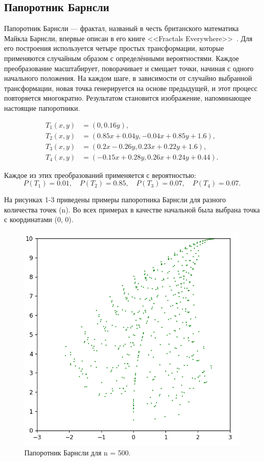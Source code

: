 \documentclass[11pt,a4paper,final]{article} %
\begin{document}
\subsection{Папоротник Барнсли}
Папоротник Барнсли — фрактал, названый в честь британского математика Майкла Барнсли, впервые описан в его книге <<Fractals Everywhere>>~\cite{barnsley}. Для его построения используется четыре простых трансформации, которые применяются случайным образом с определёнными вероятностями. Каждое преобразование масштабирует, поворачивает и смещает точки, начиная с одного начального положения. На каждом шаге, в зависимости от случайно выбранной трансформации, новая точка генерируется на основе предыдущей, и этот процесс повторяется многократно. Результатом становится изображение, напоминающее настоящие папоротники.

\[
\begin{aligned}
	T_1(x, y) &= \left( 0, 0.16y \right), \\
	T_2(x, y) &= \left( 0.85x + 0.04y, -0.04x + 0.85y + 1.6 \right), \\
	T_3(x, y) &= \left( 0.2x - 0.26y, 0.23x + 0.22y + 1.6 \right), \\
	T_4(x, y) &= \left( -0.15x + 0.28y, 0.26x + 0.24y + 0.44 \right).
\end{aligned}
\]

Каждое из этих преобразований применяется с вероятностью:
\[
P(T_1) = 0.01, \quad P(T_2) = 0.85, \quad P(T_3) = 0.07, \quad P(T_4) = 0.07.
\]

На рисунках 1-3 приведены примеры папоротника Барнсли для разного количества точек (n). Во всех примерах в качестве начальной была выбрана точка с координатами (0, 0).

\begin{figure}[H]
	\centering
	\includegraphics[width=0.6 \linewidth]{img/fern1.png}
	\caption{Папоротник Барнсли для n = 500.}
	\label{fig:fern500}
\end{figure}
\end{document}
